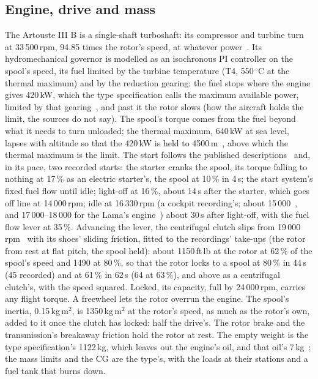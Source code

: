 \documentclass[10pt,a4paper,twocolumn]{article}
\begin{document}
\subsection{Engine, drive and mass}
The Artouste III B is a single-shaft turboshaft: its compressor and turbine turn at 33\,500\,rpm, 94.85 times the rotor's speed, at whatever
power~\cite{te,e77}. Its hydromechanical governor is modelled as an isochronous PI controller on the spool's speed, its fuel limited by the
turbine temperature (T4, 550\,$^\circ$C at the thermal maximum) and by the reduction gearing: the fuel stops where the engine gives
420\,kW, which the type specification calls the maximum available power, limited by that gearing~\cite{spec}, and past it the rotor
slows (how the aircraft holds the limit, the sources do not say). The spool's torque comes from the fuel beyond what it needs to turn
unloaded; the thermal maximum, 640\,kW at sea level, lapses with altitude so that the 420\,kW is held to
4500\,m~\cite{spec}, above which the thermal maximum is the limit.
The start follows the published descriptions~\cite{rw,lm} and, in its pace, two recorded starts: the starter cranks the spool,
its torque falling to nothing at 17\,\% as an electric starter's, the spool at 10\,\% in 4\,s; the start system's fixed fuel flow
until idle; light-off at 16\,\%, about 14\,s after the starter, which goes off line at 14\,000\,rpm; idle at 16\,330\,rpm (a cockpit
recording's; about 15\,000~\cite{ao}, and 17\,000--18\,000 for the Lama's engine~\cite{rw}) about 30\,s after light-off, with the fuel
flow lever at 35\,\%. Advancing the lever, the centrifugal clutch slips
from 19\,000\,rpm~\cite{ao} with its shoes' sliding friction, fitted to the recordings' take-ups (the rotor from rest at flat pitch,
the spool held): about 1150\,ft\,lb at the rotor at 62\,\% of the spool's speed and 1490 at 80\,\%, so that the rotor locks to
a spool at 80\,\% in 44\,s (45 recorded) and at 61\,\% in 62\,s (64 at 63\,\%), and above as a centrifugal clutch's, with the
speed squared. Locked, its capacity, full by 24\,000\,rpm, carries any flight torque. A freewheel lets the rotor overrun the engine. The
spool's inertia, 0.15\,kg\,m$^2$, is 1350\,kg\,m$^2$ at the rotor's speed, as much as the rotor's own, added to it once the clutch has
locked: half the drive's. The rotor brake and the transmission's breakaway friction hold the rotor at rest. The empty weight is the
type specification's 1122\,kg, which leaves out the engine's oil, and that oil's 7\,kg~\cite{spec}; the mass limits and the CG are the
type's, with the loads at their stations and a fuel tank that burns down.
\end{document}
